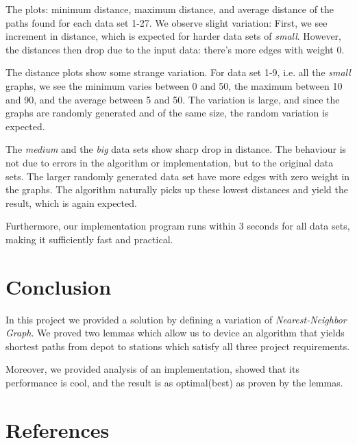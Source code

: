 \documentclass[12pt]{article}  %
\begin{document}
\begin{center}
{\footnotesize The plots: minimum distance, maximum distance, and average distance of the paths found for each data set 1-27. We observe slight variation: First, we see increment in distance, which is expected for harder data sets of \emph{small}. However, the distances then drop due to the input data: there's more edges with weight 0.}
\end{center}

The distance plots show some strange variation. For data set 1-9, i.e. all the \emph{small} graphs, we see the minimum varies between 0 and 50, the maximum between 10 and 90, and the average between 5 and 50. The variation is large, and since the graphs are randomly generated and of the same size, the random variation is expected.

The \emph{medium} and the \emph{big} data sets show sharp drop in distance. The behaviour is not due to errors in the algorithm or implementation, but to the original data sets. The larger randomly generated data set have more edges with zero weight in the graphs. The algorithm naturally picks up these lowest distances and yield the result, which is again expected.

Furthermore, our implementation program runs within 3 seconds for all data sets, making it sufficiently fast and practical.



\section{Conclusion}
In this project we provided a solution by defining a variation of \emph{Nearest-Neighbor Graph}. We proved two lemmas which allow us to device an algorithm that yields shortest paths from depot to stations which satisfy all three project requirements.

Moreover, we provided analysis of an implementation, showed that its performance is cool, and the result is as optimal(best) as proven by the lemmas.



\section{References}
\end{document}
